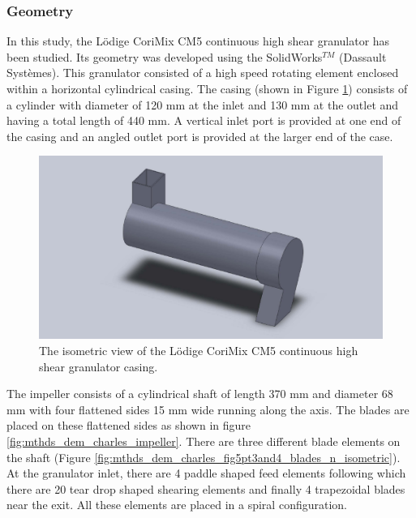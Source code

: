 \documentclass[preprint,11pt,authoryear]{elsarticle}
\begin{document}
\subsubsection{Geometry}    
 In this study, the L\"{o}dige CoriMix CM5 continuous high shear granulator has been studied. Its 
geometry was developed using the SolidWorks$^{TM}$ (Dassault Syst\`{e}mes). This granulator 
consisted of a high speed rotating element enclosed within a horizontal cylindrical casing. The casing 
(shown in Figure \ref{fig:mthdsDemCharlesGranShell}) consists of a cylinder with diameter of 120 mm 
at the inlet and 130 mm at the outlet and having a total length of 440 mm. A vertical inlet port is 
provided at one end of the casing and an angled outlet port is provided at the larger end of the case. 

\begin{figure}
\centering
\includegraphics[scale=0.2]{shell_final_pic.pdf}
\caption{The isometric view of the L\"{o}dige CoriMix CM5 continuous high shear granulator casing.}
\label{fig:mthdsDemCharlesGranShell}
\end{figure}

The impeller consists of a cylindrical shaft of length 370 mm and diameter 68 mm with four 
flattened sides 15 mm wide running along the axis. The blades are placed on these flattened sides as 
shown in figure \ref{fig:mthds_dem_charles_impeller}. There are three different blade elements on the 
shaft (Figure \ref{fig:mthds_dem_charles_fig5pt3and4_blades_n_isometric}). At the granulator inlet, 
there are 4 paddle shaped feed elements following which there are 20 tear drop shaped shearing 
elements  and finally 4 trapezoidal blades near the exit. All these elements are placed in 
a spiral configuration. 
\end{document}
